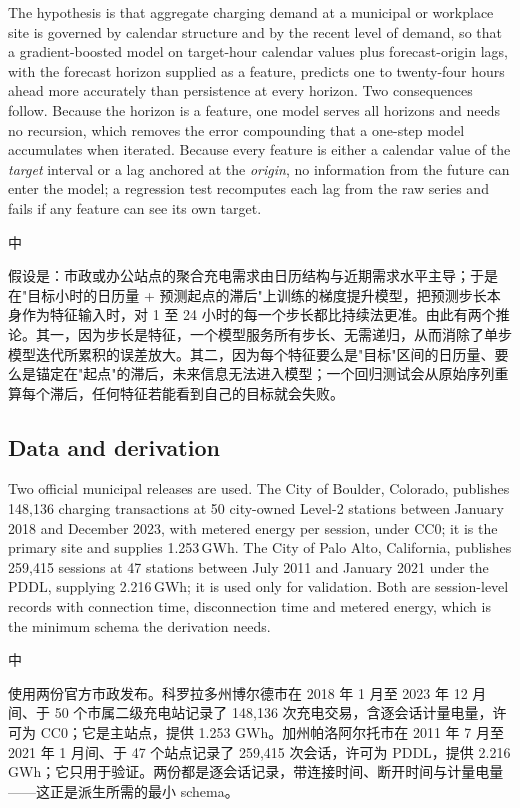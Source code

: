\documentclass[10pt,a4paper]{article}
\newenvironment{zh}{%
  \par\vspace{1pt}%
  \begingroup
  \color{black!72}\small
  \setlength{\parskip}{0pt}%
  \noindent\textsf{\footnotesize 中}\hspace{3pt}\ignorespaces
}{%
  \par\endgroup\vspace{4pt}%
}
\begin{document}
The hypothesis is that aggregate charging demand at a municipal or workplace site is governed by
calendar structure and by the recent level of demand, so that a gradient-boosted model on
target-hour calendar values plus forecast-origin lags, with the forecast horizon supplied as a
feature, predicts one to twenty-four hours ahead more accurately than persistence at every horizon.
Two consequences follow. Because the horizon is a feature, one model serves all horizons and needs
no recursion, which removes the error compounding that a one-step model accumulates when iterated.
Because every feature is either a calendar value of the \emph{target} interval or a lag anchored at
the \emph{origin}, no information from the future can enter the model; a regression test recomputes
each lag from the raw series and fails if any feature can see its own target.

\begin{zh}
假设是：市政或办公站点的聚合充电需求由日历结构与近期需求水平主导；于是在"目标小时的日历量 + 预测起点的滞后"上训练的梯度提升模型，把预测步长本身作为特征输入时，对 1 至 24 小时的每一个步长都比持续法更准。由此有两个推论。其一，因为步长是特征，一个模型服务所有步长、无需递归，从而消除了单步模型迭代所累积的误差放大。其二，因为每个特征要么是"目标"区间的日历量、要么是锚定在"起点"的滞后，未来信息无法进入模型；一个回归测试会从原始序列重算每个滞后，任何特征若能看到自己的目标就会失败。
\end{zh}

\subsection{Data and derivation}

Two official municipal releases are used. The City of Boulder, Colorado, publishes 148{,}136
charging transactions at 50 city-owned Level-2 stations between January 2018 and December 2023,
with metered energy per session, under CC0; it is the primary site and supplies 1.253\,GWh. The
City of Palo Alto, California, publishes 259{,}415 sessions at 47 stations between July 2011 and
January 2021 under the PDDL, supplying 2.216\,GWh; it is used only for validation. Both are
session-level records with connection time, disconnection time and metered energy, which is the
minimum schema the derivation needs.

\begin{zh}
使用两份官方市政发布。科罗拉多州博尔德市在 2018 年 1 月至 2023 年 12 月间、于 50 个市属二级充电站记录了 148,136 次充电交易，含逐会话计量电量，许可为 CC0；它是主站点，提供 1.253 GWh。加州帕洛阿尔托市在 2011 年 7 月至 2021 年 1 月间、于 47 个站点记录了 259,415 次会话，许可为 PDDL，提供 2.216 GWh；它只用于验证。两份都是逐会话记录，带连接时间、断开时间与计量电量——这正是派生所需的最小 schema。
\end{zh}
\end{document}
